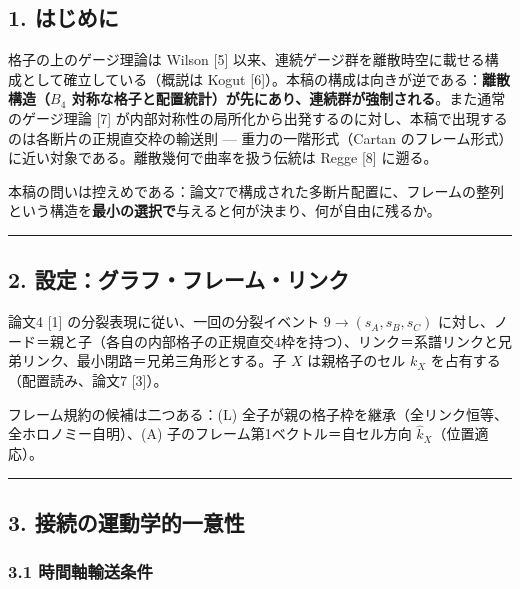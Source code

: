 \documentclass[
]{ltjsarticle}
\begin{document}
\subsection{1. はじめに}\label{ux306fux3058ux3081ux306b}

格子の上のゲージ理論は Wilson {[}5{]}
以来、連続ゲージ群を離散時空に載せる構成として確立している（概説は Kogut
{[}6{]}）。本稿の構成は向きが逆である：\textbf{離散構造（\(B_4\)
対称な格子と配置統計）が先にあり、連続群が強制される}。また通常のゲージ理論
{[}7{]}
が内部対称性の局所化から出発するのに対し、本稿で出現するのは各断片の正規直交枠の輸送則
--- 重力の一階形式（Cartan
のフレーム形式）に近い対象である。離散幾何で曲率を扱う伝統は Regge
{[}8{]} に遡る。

本稿の問いは控えめである：論文7で構成された多断片配置に、フレームの整列という構造を\textbf{最小の選択で}与えると何が決まり、何が自由に残るか。

\begin{center}\rule{0.5\linewidth}{0.5pt}\end{center}

\subsection{2.
設定：グラフ・フレーム・リンク}\label{ux8a2dux5b9aux30b0ux30e9ux30d5ux30d5ux30ecux30fcux30e0ux30eaux30f3ux30af}

論文4 {[}1{]} の分裂表現に従い、一回の分裂イベント \(9\to(s_A,s_B,s_C)\)
に対し、ノード＝親と子（各自の内部格子の正規直交4枠を持つ）、リンク＝系譜リンクと兄弟リンク、最小閉路＝兄弟三角形とする。子
\(X\) は親格子のセル \(k_X\) を占有する（配置読み、論文7 {[}3{]}）。

フレーム規約の候補は二つある：(L)
全子が親の格子枠を継承（全リンク恒等、全ホロノミー自明）、(A)
子のフレーム第1ベクトル＝自セル方向 \(\hat k_X\)（位置適応）。

\begin{center}\rule{0.5\linewidth}{0.5pt}\end{center}

\subsection{3.
接続の運動学的一意性}\label{ux63a5ux7d9aux306eux904bux52d5ux5b66ux7684ux4e00ux610fux6027}

\subsubsection{3.1
時間軸輸送条件}\label{ux6642ux9593ux8ef8ux8f38ux9001ux6761ux4ef6}
\end{document}
